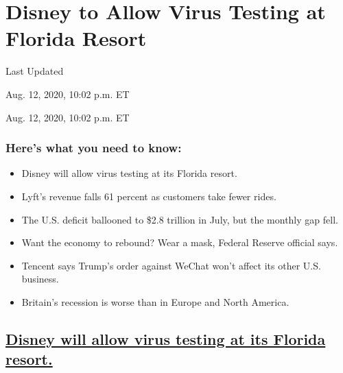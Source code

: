 \hypertarget{disney-to-allow-virus-testing-at-florida-resort}{%
\section{Disney to Allow Virus Testing at Florida
Resort}\label{disney-to-allow-virus-testing-at-florida-resort}}

Last Updated

Aug. 12, 2020, 10:02 p.m. ET

Aug. 12, 2020, 10:02 p.m. ET

\hypertarget{heres-what-you-need-to-know}{%
\subsubsection{Here's what you need to
know:}\label{heres-what-you-need-to-know}}

\begin{itemize}
\item
  \protect\hyperlink{disney-will-allow-virus-testing-at-its-florida-resort}{}

  Disney will allow virus testing at its Florida resort.
\item
  \protect\hyperlink{lyfts-revenue-falls-61-percent-as-customers-take-fewer-rides}{}

  Lyft's revenue falls 61 percent as customers take fewer rides.
\item
  \protect\hyperlink{the-us-deficit-ballooned-to-2-8-trillion-in-july-but-the-monthly-gap-fell}{}

  The U.S. deficit ballooned to \$2.8 trillion in July, but the monthly
  gap fell.
\item
  \protect\hyperlink{want-the-economy-to-rebound-wear-a-mask-federal-reserve-official-says}{}

  Want the economy to rebound? Wear a mask, Federal Reserve official
  says.
\item
  \protect\hyperlink{tencent-says-trumps-order-against-wechat-wont-affect-its-other-us-business}{}

  Tencent says Trump's order against WeChat won't affect its other U.S.
  business.
\item
  \protect\hyperlink{britains-recession-is-worse-than-in-europe-and-north-america}{}

  Britain's recession is worse than in Europe and North America.
\end{itemize}

\hypertarget{disney-will-allow-virus-testing-at-its-florida-resort}{%
\subsection{\texorpdfstring{\protect\hyperlink{disney-will-allow-virus-testing-at-its-florida-resort}{Disney
will allow virus testing at its Florida
resort.}}{Disney will allow virus testing at its Florida resort.}}\label{disney-will-allow-virus-testing-at-its-florida-resort}}

